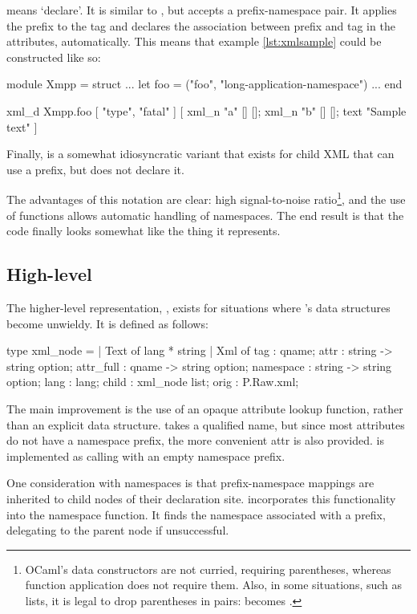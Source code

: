 \documentclass[12pt,a4paper,twoside,openright]{report}
\begin{document}
{ means `declare'. It is similar to , but accepts a prefix-namespace pair. It applies the prefix to the tag and declares the association between prefix and tag in the attributes, automatically. This means that example \ref{lst:xmlsample} could be constructed like so:

\begin{ocaml}
module Xmpp = struct
  ...
  let foo = ("foo", "long-application-namespace")
  ...
end

xml_d Xmpp.foo [ "type", "fatal" ] [
  xml_n "a" [] [];
  xml_n "b" [] [];
  text "Sample text"
]
\end{ocaml}

Finally,  is a somewhat idiosyncratic variant that exists for child XML that can use a prefix, but does not declare it.

The advantages of this notation are clear: high signal-to-noise ratio\footnote{OCaml's data constructors are not curried, requiring parentheses, whereas function application does not require them. Also, in some situations, such as lists, it is legal to drop parentheses in pairs: \code{[ (x,y); (z,w) ]} becomes \code{[ x,y; z,w ]}.}, and the use of functions allows automatic handling of namespaces. The end result is that the code finally looks somewhat like the thing it represents.

\subsection{High-level }
The higher-level representation, , exists for situations where 's data structures become unwieldy. It is defined as follows:

\begin{ocaml}
type xml_node =
| Text of lang * string
| Xml of {
  tag    : qname;
  attr   : string -> string option;
  attr_full : qname -> string option;
  namespace : string -> string option;
  lang  : lang;
  child : xml_node list;
  orig  : P.Raw.xml;
}
\end{ocaml}

The main improvement is the use of an opaque attribute lookup function, rather than an explicit data structure.  takes a qualified name, but since most attributes do not have a namespace prefix, the more convenient attr is also provided.  is implemented as calling  with an empty namespace prefix.

One consideration with namespaces is that prefix-namespace mappings are inherited to child nodes of their declaration site.  incorporates this functionality into the namespace function. It finds the namespace associated with a prefix, delegating to the parent node if unsuccessful.

}
\end{document}
